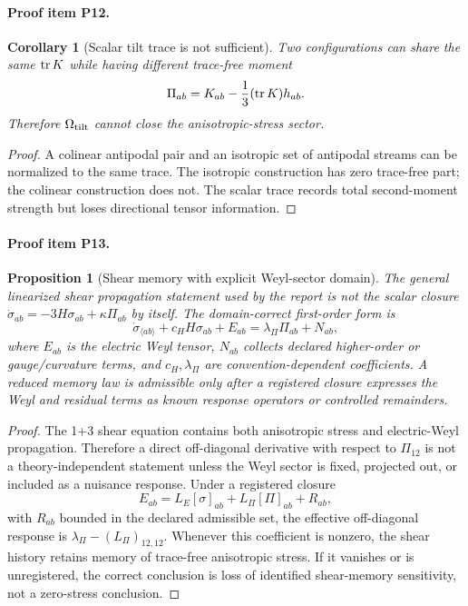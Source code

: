 \documentclass[11pt]{article}
\newtheorem{proposition}{Proposition}
\newtheorem{corollary}{Corollary}
\begin{document}
\paragraph{Proof item P12.}
\begin{corollary}[Scalar tilt trace is not sufficient]
Two configurations can share the same \({\rm tr}\,K\) while having different trace-free moment
\[
  \Pi_{ab}=K_{ab}-\frac13({\rm tr}\,K)h_{ab}.
\]
Therefore \(\Omega_{\rm tilt}\) cannot close the anisotropic-stress sector.
\end{corollary}
\begin{proof}
A colinear antipodal pair and an isotropic set of antipodal streams can be normalized to the same trace.  The isotropic construction has zero trace-free part; the colinear construction does not.  The scalar trace records total second-moment strength but loses directional tensor information.
\end{proof}

\paragraph{Proof item P13.}
\begin{proposition}[Shear memory with explicit Weyl-sector domain]
The general linearized shear propagation statement used by the report is not the scalar closure
\(\dot\sigma_{ab}=-3H\sigma_{ab}+\kappa\Pi_{ab}\) by itself.  The domain-correct first-order form is
\[
  \dot\sigma_{\langle ab\rangle}
  +c_H H\sigma_{ab}
  +E_{ab}
  =\lambda_\Pi \Pi_{ab}+N_{ab},
\]
where \(E_{ab}\) is the electric Weyl tensor, \(N_{ab}\) collects declared higher-order or gauge/curvature terms, and \(c_H,\lambda_\Pi\) are convention-dependent coefficients.  A reduced memory law is admissible only after a registered closure expresses the Weyl and residual terms as known response operators or controlled remainders.
\end{proposition}
\begin{proof}
The 1+3 shear equation contains both anisotropic stress and electric-Weyl propagation.  Therefore a direct off-diagonal derivative with respect to \(\Pi_{12}\) is not a theory-independent statement unless the Weyl sector is fixed, projected out, or included as a nuisance response.  Under a registered closure
\[
  E_{ab}=L_E[\sigma]_{ab}+L_\Pi[\Pi]_{ab}+R_{ab},
\]
with \(R_{ab}\) bounded in the declared admissible set, the effective off-diagonal response is \(\lambda_\Pi-(L_\Pi)_{12,12}\).  Whenever this coefficient is nonzero, the shear history retains memory of trace-free anisotropic stress.  If it vanishes or is unregistered, the correct conclusion is loss of identified shear-memory sensitivity, not a zero-stress conclusion.
\end{proof}
\end{document}
